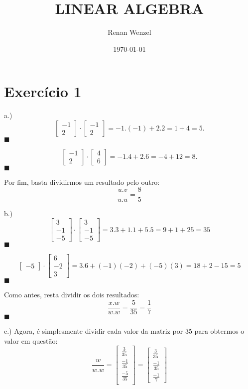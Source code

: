 \documentclass{article}
\title{LINEAR ALGEBRA}
\author{Renan Wenzel}
\date{\today}
\renewcommand\qedsymbol{$\blacksquare$}
\begin{document}
\section*{Exerc\'icio 1}
a.)
\[
	\begin{bmatrix}
		-1 \\
		2
	\end{bmatrix}
	\cdot
	\begin{bmatrix}
		-1 \\
		2
	\end{bmatrix}
	= -1.(-1) + 2.2 = 1 + 4 = 5.
\]
\qedsymbol

\[
	\begin{bmatrix}
		-1 \\
		2
	\end{bmatrix}
	\cdot
	\begin{bmatrix}
		4 \\
		6
	\end{bmatrix}
	= -1.4 + 2.6 = -4 + 12 = 8.
\]
\qedsymbol

Por fim, basta dividirmos um resultado pelo outro:
$$
	\frac{u.v}{u.u} = \frac{8}{5}
$$

b.)
$$
	\begin{bmatrix}
		3  \\
		-1 \\
		-5
	\end{bmatrix}
	\cdot
	\begin{bmatrix}
		3  \\
		-1 \\
		-5
	\end{bmatrix}
	= 3.3 + 1.1 + 5.5 = 9 + 1 + 25 = 35
$$ \qedsymbol

$$
	\begin{bmatrix}
		-5
	\end{bmatrix}
	\cdot
	\begin{bmatrix}
		6  \\
		-2 \\
		3
	\end{bmatrix}
	= 3.6 + (-1)(-2) + (-5)(3) = 18 + 2 - 15 = 5
$$\qedsymbol

Como antes, resta dividir os dois resultados:
$$
	\frac{x.w}{w.w} = \frac{5}{35} = \frac{1}{7}
$$ \qedsymbol

c.) Agora, \'e simplesmente dividir cada valor da matriz por 35 para obtermos o valor em quest\~ao:
$$
	\frac{w}{w.w} = \begin{bmatrix}
		\frac{3}{35}  \\
		\frac{-1}{35} \\
		\frac{-5}{35} \\
	\end{bmatrix} = \begin{bmatrix}
		\frac{3}{35}  \\
		\frac{-1}{35} \\
		\frac{-1}{7}
	\end{bmatrix}
$$
\end{document}
